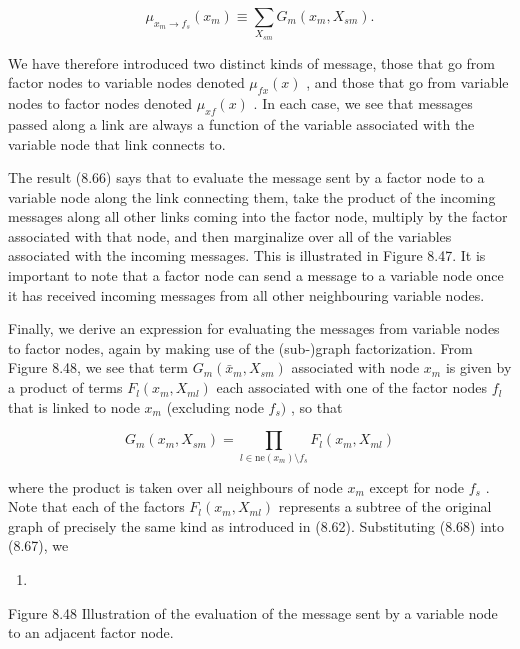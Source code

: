 \documentclass[
  10
]{article}
\providecommand{\tightlist}{%
  \setlength{\itemsep}{0pt}\setlength{\parskip}{0pt}}
\begin{document}
\[
\mu_ {x _ {m} \to f _ {s}} (x _ {m}) \equiv \sum_ {X _ {s m}} G _ {m} (x _ {m}, X _ {s m}).\tag{8.67}
\]

We have therefore introduced two distinct kinds of message, those that
go from factor nodes to variable nodes denoted \(\mu _ { f  x } ( x )\)
, and those that go from variable nodes to factor nodes denoted
\(\mu _ { x  f } ( x )\) . In each case, we see that messages passed
along a link are always a function of the variable associated with the
variable node that link connects to.

The result (8.66) says that to evaluate the message sent by a factor
node to a variable node along the link connecting them, take the product
of the incoming messages along all other links coming into the factor
node, multiply by the factor associated with that node, and then
marginalize over all of the variables associated with the incoming
messages. This is illustrated in Figure 8.47. It is important to note
that a factor node can send a message to a variable node once it has
received incoming messages from all other neighbouring variable nodes.

Finally, we derive an expression for evaluating the messages from
variable nodes to factor nodes, again by making use of the (sub-)graph
factorization. From Figure 8.48, we see that term
\(G _ { m } ( \bar { x } _ { m } , X _ { s m } )\) associated with node
\(x _ { m }\) is given by a product of terms
\(F _ { l } ( x _ { m } , X _ { m l } )\) each associated with one of
the factor nodes \(f _ { l }\) that is linked to node \(x _ { m }\)
(excluding node \(f _ { s } )\) , so that

\[
G _ {m} (x _ {m}, X _ {s m}) = \prod_ {l \in \mathrm{ne} (x _ {m}) \setminus f _ {s}} F _ {l} (x _ {m}, X _ {m l})\tag{8.68}
\]

where the product is taken over all neighbours of node \(x _ { m }\)
except for node \(f _ { s }\) . Note that each of the factors
\(F _ { l } ( x _ { m } , X _ { m l } )\) represents a subtree of the
original graph of precisely the same kind as introduced in (8.62).
Substituting (8.68) into (8.67), we

\begin{enumerate}
\def\labelenumi{(\alph{enumi})}
\tightlist
\item
\end{enumerate}

Figure 8.48 Illustration of the evaluation of the message sent by a
variable node to an adjacent factor node.
\end{document}
